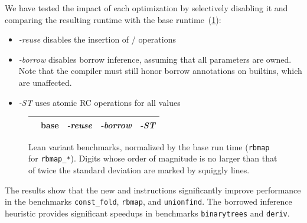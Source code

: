 We have tested the impact of each optimization by selectively disabling it and
comparing the resulting runtime with the base runtime~(\cref{fig:leanbench}):
\begin{itemize}
\item \emph{-reuse} disables the insertion of / operations
\item \emph{-borrow} disables borrow inference, assuming that all parameters are
  owned. Note that the compiler must still honor borrow annotations on builtins,
  which are unaffected.
\item \emph{-ST} uses atomic RC operations for all values
\end{itemize}

\begin{figure}
  \centering
  \begin{tabular}{lrrrr} \toprule
    & base & \emph{-reuse} & \emph{-borrow} & \emph{-ST} \\ \midrule
    
    \bottomrule
  \end{tabular}
  \caption{Lean variant benchmarks, normalized by the base run time (\texttt{rbmap} for \texttt{rbmap\_*}). Digits whose
    order of magnitude is no larger than that of twice the standard deviation are marked by squiggly lines.}
  \label{fig:leanbench}
\end{figure}

The results show that the new  and  instructions significantly improve
performance in the benchmarks \verb!const_fold!, \verb!rbmap!, and
\verb!unionfind!. The borrowed inference heuristic
provides significant speedups in benchmarks \verb!binarytrees! and
\verb!deriv!.

